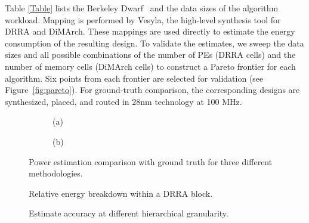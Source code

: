 Table \ref{Table} lists the Berkeley Dwarf~\cite{asanovic2006landscape} and the data sizes of the algorithm workload. 
Mapping is performed by Vesyla\cite{yang2022vesyla}, the high-level synthesis tool for DRRA and DiMArch. 
These mappings are used directly to estimate the energy consumption of the resulting design.
To validate the estimates, we sweep the data sizes and all possible combinations of the number of PEs (DRRA cells) and the number of memory cells (DiMArch cells) to construct a Pareto frontier for each algorithm. 
Six points from each frontier are selected for validation (see Figure~\ref{fig:pareto}).
For ground-truth comparison, the corresponding designs are synthesized, placed, and routed in 28nm technology at 100 MHz. 


%     
%     
\begin{figure}[t]
    \centering
    \begin{subfigure}{\textwidth}
        \centering
        
        \caption*{\small (a)}
    \end{subfigure}
    \hfill
    \begin{subfigure}{\textwidth}
        \centering
        
        \caption*{\small (b)}
    \end{subfigure}

    \caption{\small Power estimation comparison with ground truth for three different methodologies.}
    \label{fig:power}
\end{figure}

\begin{figure}
        \centering    
            
        \caption{\small Relative energy breakdown within a DRRA block.}        
        \label{fig:relative}
\end{figure}
\begin{figure}[t]
    
    \caption{\small Estimate accuracy at different hierarchical granularity.}
    \label{fig:granularity}
\end{figure}


